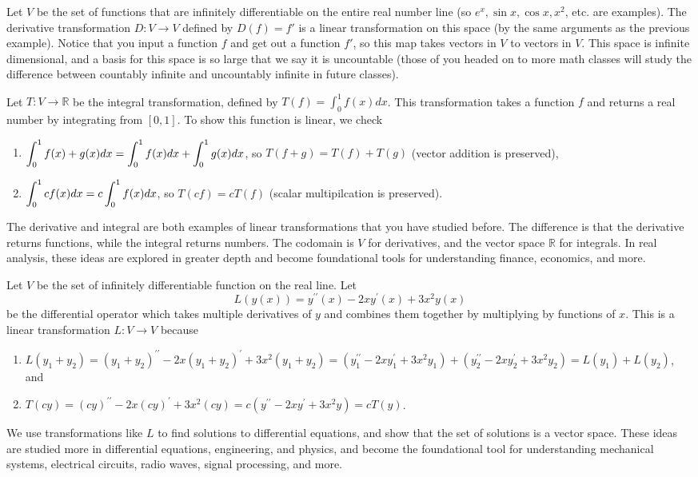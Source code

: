 \begin{example}
Let $V$ be the set of functions that are infinitely differentiable on the entire real number line (so $e^x, \sin x, \cos x, x^2$, etc. are examples). 
The derivative transformation $D:V\to V$ defined by $D(f) = f'$ is a linear transformation on this space (by the same arguments as the previous example). Notice that you input a function $f$ and get out a function $f'$, so this map takes vectors in $V$ to vectors in $V$.  This space is infinite dimensional, and a basis for this space is so large that we say it is uncountable (those of you headed on to more math classes will study the difference between countably infinite and uncountably infinite in future classes).

Let $T:V\to \mathbb{R}$ be the integral transformation, defined by $T(f)=\int_0^1 f(x)dx$.  This transformation takes a function $f$ and returns a real number by integrating from $[0,1]$.  To show this function is linear, we check 
\begin{enumerate}
	\item $\displaystyle \int_0^1 f(x)+g(x)dx=\int_0^1 f(x)dx+\int_0^1 g(x)dx$, so $T(f+g)= T(f)+T(g)$ (vector addition is preserved), 
	\item $\displaystyle \int_0^1 cf(x)dx =c\int_0^1 f(x)dx$, so $T(cf) = cT(f)$ (scalar multipilcation is preserved).
\end{enumerate}
The derivative and integral are both examples of linear transformations that you have studied before. The difference is that the derivative returns functions, while the integral returns numbers.  The codomain is $V$ for derivatives, and the vector space $\mathbb{R}$ for integrals.  
In real analysis, these ideas are explored in greater depth and become foundational tools for understanding finance, economics, and more.
\end{example}

\begin{example}
Let $V$ be the set of infinitely differentiable function on the real line.  Let $$L(y(x))=y^{\prime\prime}(x)-2xy^\prime(x)+3x^2 y(x)$$ be the differential operator which takes multiple derivatives of $y$ and combines them together by multiplying by functions of $x$.  This is a linear transformation $L:V\to V$ because 
\begin{enumerate}
	\item $L(y_1+y_2)=(y_1+y_2)^{\prime\prime}-2x(y_1+y_2)^\prime+3x^2 (y_1+y_2) = (y_1^{\prime\prime}-2xy_1^\prime+3x^2 y_1) +(y_2^{\prime\prime}-2xy_2^\prime+3x^2 y_2)=L(y_1)+L(y_2)$, and
	\item $T(cy)=(cy)^{\prime\prime}-2x(cy)^\prime+3x^2 (cy) = c(y^{\prime\prime}-2xy^\prime+3x^2 y)=cT(y)$.
\end{enumerate}
 We use transformations like $L$ to find solutions to differential equations, and show that the set of solutions is a vector space. These ideas are studied more in differential equations, engineering, and physics, and become the foundational tool for understanding mechanical systems, electrical circuits, radio waves, signal processing, and more.  
\end{example}






